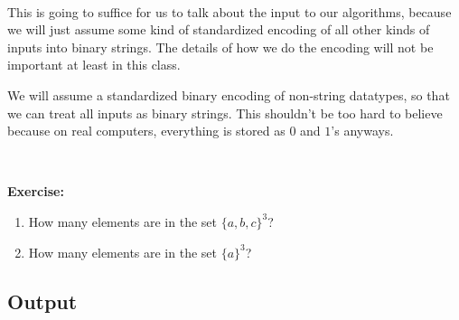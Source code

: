\documentclass{article}
\begin{document}
\

\noindent This is going to suffice for us to talk about the input to our algorithms, because we will just assume some kind of standardized encoding of all other kinds of inputs into binary strings. The details of how we do the encoding will not be important at least in this class.

We will assume a standardized binary encoding of non-string datatypes, so that we can treat all inputs as binary strings. This shouldn't be too hard to believe because on real computers, everything is stored as $0$ and $1$'s anyways.

\

{\large \textbf{Exercise:}}
\begin{enumerate}
    \item How many elements are in the set $\{a,b,c\}^3$?
    \item How many elements are in the set $\{a\}^3$?
\end{enumerate}



\subsection*{Output}
\begin{figure}[H]
    \caption*{}
\end{figure}
\end{document}

